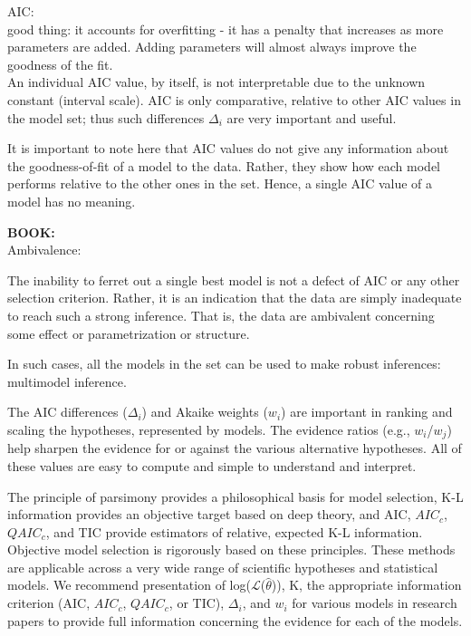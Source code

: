 \documentclass[11pt]{article}
\begin{document}
\begin{linenumbers}
	AIC:\\
	good thing: it accounts for overfitting - it has a penalty that increases as more parameters are added. Adding parameters will almost always improve the goodness of the fit.\\
	An individual AIC value, by itself, is not interpretable due to the unknown constant (interval scale). AIC is only comparative, relative to other AIC values in the model set; thus such differences $\Delta_i$ are very important and useful.
	
	It is important to note here that AIC values do not give any information about the goodness-of-fit of a model to the data. Rather, they show how each model performs relative to the other ones in the set. Hence, a single AIC value of a model has no meaning.
	
	\textbf{BOOK:}\\
	Ambivalence:
	\par The inability to ferret out a single best model is not a defect of AIC or any other selection criterion. Rather, it is an indication that the data are simply inadequate to reach such a strong inference. That is, the data are ambivalent concerning some effect or parametrization or structure.
	\par In such cases, all the models in the set can be used to make robust inferences: multimodel inference.\\

	\par The AIC differences ($\Delta_i$) and Akaike weights ($w_i$) are important in ranking and scaling the hypotheses, represented by models. The evidence ratios (e.g., $w_i$/$w_j$) help sharpen the evidence for or against the various alternative hypotheses. All of these values are easy to compute and simple to understand and interpret.\\

	\par The principle of parsimony provides a philosophical basis for model selection, K-L information provides an objective target based on deep theory, and AIC, $AIC_c$, $QAIC_c$, and TIC provide estimators of relative, expected K-L information. Objective model selection is rigorously based on these principles. These methods are applicable across a very wide range of scientific hypotheses and statistical models. We recommend presentation of log($\mathcal{L}$($\hat\theta$)), K, the appropriate information criterion (AIC, $AIC_c$, $QAIC_c$, or TIC), $\Delta_i$, and $w_i$ for various models in research papers to provide full information concerning the evidence for each of the models.\\


\end{linenumbers}
\end{document}

